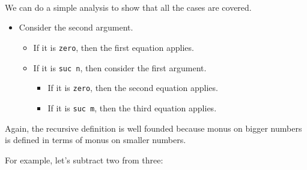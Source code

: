 \begin{fence}
\begin{code}%
\>[0]\AgdaSpace{}%
\AgdaSymbol{:}\AgdaSpace{}%
\AgdaSpace{}%
\AgdaSpace{}%
\AgdaSpace{}%
\AgdaSpace{}%
\<%
\\
\>[0]%
\>[6]\AgdaSpace{}%
%
\>[15]\AgdaSymbol{=}%
\>[18]\<%
\\
\>[0]%
\>[6]\AgdaSpace{}%
\AgdaSpace{}%
%
\>[15]\AgdaSymbol{=}%
\>[18]\<%
\\
\>[0]\AgdaSpace{}%
\AgdaSpace{}%
\AgdaSpace{}%
\AgdaSpace{}%
%
\>[15]\AgdaSymbol{=}%
\>[18]\AgdaSpace{}%
\AgdaSpace{}%
\<%
\end{code}
\end{fence}

We can do a simple analysis to show that all the cases are covered.

\begin{itemize}
\tightlist
\item
  Consider the second argument.

  \begin{itemize}
  \tightlist
  \item
    If it is \texttt{zero}, then the first equation applies.
  \item
    If it is \texttt{suc\ n}, then consider the first argument.

    \begin{itemize}
    \tightlist
    \item
      If it is \texttt{zero}, then the second equation applies.
    \item
      If it is \texttt{suc\ m}, then the third equation applies.
    \end{itemize}
  \end{itemize}
\end{itemize}

Again, the recursive definition is well founded because monus on bigger
numbers is defined in terms of monus on smaller numbers.

For example, let's subtract two from three:

